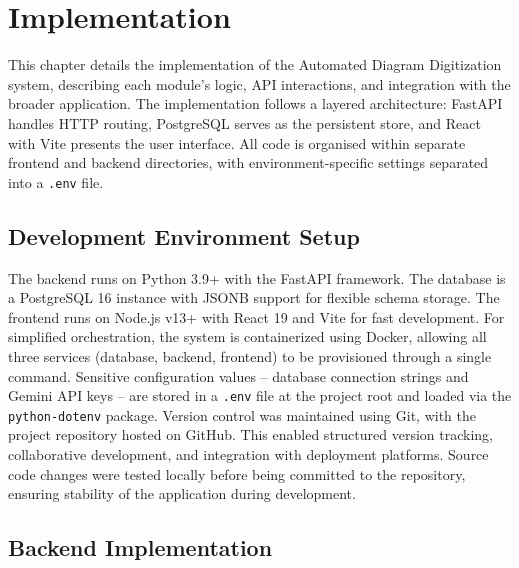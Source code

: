 
\chapter{Implementation}
\label{ch:implementation}

This chapter details the implementation of the Automated Diagram Digitization system, describing each module's logic, API interactions, and integration with the broader application. The implementation follows a layered architecture: FastAPI handles HTTP routing, PostgreSQL serves as the persistent store, and React with Vite presents the user interface. All code is organised within separate frontend and backend directories, with environment-specific settings separated into a \texttt{.env} file.

\section{Development Environment Setup}
\label{sec:dev-env}

The backend runs on Python 3.9+ with the FastAPI framework. The database is a PostgreSQL 16 instance with JSONB support for flexible schema storage. The frontend runs on Node.js v13+ with React 19 and Vite for fast development. For simplified orchestration, the system is containerized using Docker, allowing all three services (database, backend, frontend) to be provisioned through a single command. Sensitive configuration values -- database connection strings and Gemini API keys -- are stored in a \texttt{.env} file at the project root and loaded via the \texttt{python-dotenv} package. Version control was maintained using Git, with the project repository hosted on GitHub. This enabled structured version tracking, collaborative development, and integration with deployment platforms. Source code changes were tested locally before being committed to the repository, ensuring stability of the application during development.



\section{Backend Implementation}
\label{sec:backend}

